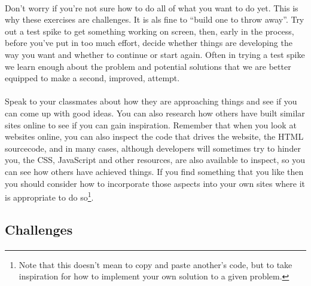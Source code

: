 \documentclass[10pt, a4paper]{article}
\begin{document}
\paragraph{} Don't worry if you're not sure how to do all of what you want to do yet. This is why these exercises are challenges. It is als fine to ``build one to throw away''. Try out a test spike to get something working on screen, then, early in the process, before you've put in too much effort, decide whether things are developing the way you want and whether to continue or start again. Often in trying a test spike we learn enough about the problem and potential solutions that we are better equipped to make a second, improved, attempt.

\paragraph{} Speak to your classmates about how they are approaching things and see if you can come up with good ideas. You can also research how others have built similar sites online to see if you can gain inspiration. Remember that when you look at websites online, you can also inspect the code that drives the website, the HTML sourcecode, and in many cases, although developers will sometimes try to hinder you, the CSS, JavaScript and other resources, are also available to inspect, so you can see how others have achieved things. If you find something that you like then you should consider how to incorporate those aspects into your own sites where it is appropriate to do so\footnote{Note that this doesn't mean to copy and paste another's code, but to take inspiration for how to implement your own solution to a given problem.}.

\subsection{Challenges}
\paragraph{}
\end{document}
